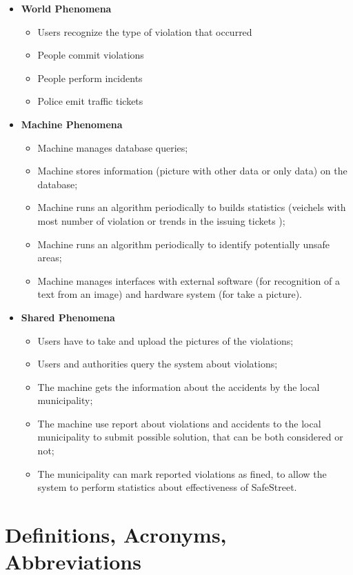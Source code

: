 \documentclass[a4paper, hidelinks, 12pt]{report}
\begin{document}
	\begin{itemize}
		\item \textbf{World Phenomena}
		\begin{itemize}
			\item Users recognize the type of violation that occurred
			\item People commit violations
			\item People perform incidents
			\item Police emit traffic tickets
		\end{itemize}
		\item \textbf{Machine Phenomena}
		\begin{itemize}
			\item Machine manages database queries;
			\item Machine stores information (picture with other data or only data) on the database;
			\item Machine runs an algorithm periodically to builds statistics (veichels with most number of violation or trends in the issuing tickets );
			\item Machine runs an algorithm periodically to identify potentially unsafe areas;
			\item Machine manages interfaces with external software (for recognition of a text from an image) and hardware system (for take a picture).
		\end{itemize}
		\item \textbf{Shared Phenomena}
		\begin{itemize}
			\item Users have to take and upload the pictures of the violations;
			\item Users and authorities query the system about violations;
			\item The machine gets the information about the accidents by the local municipality;
			\item The machine use report about violations and accidents to the local municipality to submit possible solution, that can be both considered or not;
			\item The municipality can mark reported violations as fined, to allow the system to perform statistics about effectiveness of SafeStreet.
		\end{itemize}
	\end{itemize}

	\section{Definitions, Acronyms, Abbreviations}\label{sec:definitions,-acronyms,-abbreviations}
\end{document}
